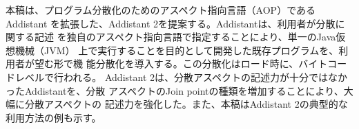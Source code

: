 本稿は、プログラム分散化のためのアスペクト指向言語（AOP）であるAddistant%
を拡張した、Addistant 2を提案する。Addistantは、利用者が分散に関する記述
を独自のアスペクト指向言語で指定することにより、単一のJava仮想機械（JVM）
上で実行することを目的として開発した既存プログラムを、利用者が望む形で機
能分散化を導入する。この分散化はロード時に、バイトコードレベルで行われる。
Addistant 2は、分散アスペクトの記述力が十分ではなかったAddistantを、分散
アスペクトのJoin pointの種類を増加することにより、大幅に分散アスペクトの
記述力を強化した。また、本稿はAddistant 2の典型的な利用方法の例も示す。
